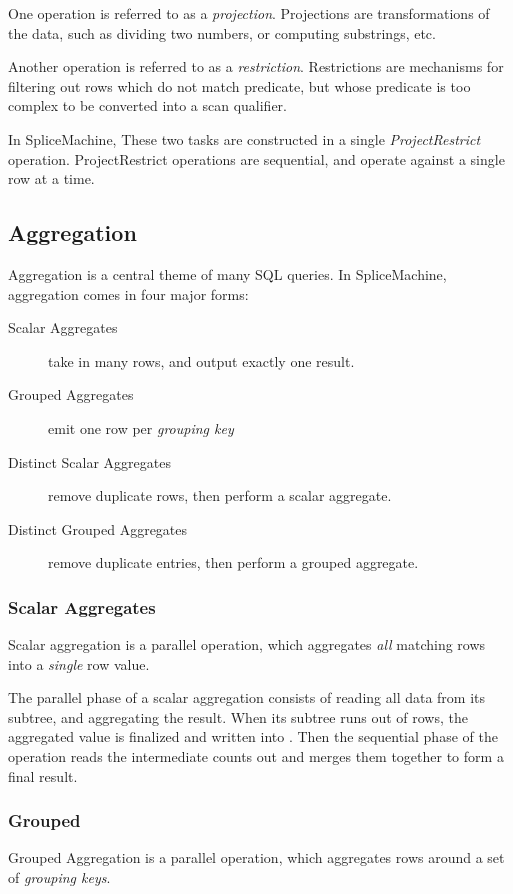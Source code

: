 One operation is referred to as a \emph{projection}. Projections are transformations of the data, such as dividing two numbers, or computing substrings, etc. 

Another operation is referred to as a \emph{restriction}. Restrictions are mechanisms for filtering out rows which do not match predicate, but whose predicate is too complex to be converted into a scan qualifier.

In SpliceMachine, These two tasks are constructed in a single \emph{ProjectRestrict} operation. ProjectRestrict operations are sequential, and operate against a single row at a time.

\subsection{Aggregation}
Aggregation is a central theme of many SQL queries. In SpliceMachine, aggregation comes in four major forms:

\begin{description}
				\item[Scalar Aggregates] take in many rows, and output exactly one result.
				\item[Grouped Aggregates] emit one row per \emph{grouping key}
				\item[Distinct Scalar Aggregates] remove duplicate rows, then perform a scalar aggregate.
				\item[Distinct Grouped Aggregates] remove duplicate entries, then perform a grouped aggregate.
\end{description}
\subsubsection{Scalar Aggregates}
Scalar aggregation is a parallel operation, which aggregates \emph{all} matching rows into a \emph{single} row value. 

The parallel phase of a scalar aggregation consists of reading all data from its subtree, and aggregating the result. When its subtree runs out of rows, the aggregated value is finalized and written into \temp. Then the sequential phase of the operation reads the intermediate counts out and merges them together to form a final result.

\subsubsection{Grouped}
Grouped Aggregation is a parallel operation, which aggregates rows around a set of \emph{grouping keys}. 

